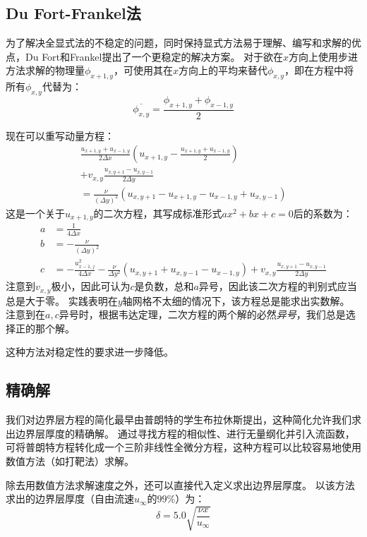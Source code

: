 \documentclass[12pt]{ctexart}
\begin{document}
\subsection{Du Fort-Frankel法}

为了解决全显式法的不稳定的问题，同时保持显式方法易于理解、编写和求解的优点，Du Fort和Frankel提出了一个更稳定的解决方案\cite{du1953stability}。
对于欲在$x$方向上使用步进方法求解的物理量$\phi_{x+1,y}$，可使用其在$x$方向上的平均来替代$\phi_{x, y}$，即在方程中将所有$\phi_{x,y}$代替为：
\[ \overline{\phi_{x,y}} = \frac{\phi_{x+1,y} + \phi_{x-1,y}}{2} \]

现在可以重写动量方程：
\begin{multline*}
    \frac{u_{x+1,y} + u_{x-1,y}}{2 \Delta x} \left( u_{x+1,y} - \frac{u_{x+1,y}+u_{x-1,y}}{2} \right) \\
    + v_{x,y} \frac{u_{x, y+1} - u_{x, y-1}}{2 \Delta y} \\
    = \frac{\nu}{(\Delta y)^2} (u_{x,y+1} - u_{x+1,y} - u_{x-1,y} + u_{x,y-1})
\end{multline*}
这是一个关于$u_{x+1, y}$的二次方程，其写成标准形式$ax^2+bx+c=0$后的系数为：
\[
    \begin{aligned}
        a &= \frac{1}{4 \Delta x} \\
        b &= - \frac{\nu}{(\Delta y)^2} \\
        c &= - \frac{u_{x-1,j}^2}{4 \Delta x} - \frac{\nu}{\Delta y^2} \left( u_{x,y+1} + u_{x,y-1} - u_{x-1,y} \right) + v_{x,y} \frac{u_{x, y+1} - u_{x, y-1}}{2 \Delta y}
    \end{aligned}
\]
注意到$v_{x,y}$极小，因此可认为$c$是负数，总和$a$异号，因此该二次方程的判别式应当总是大于零。
实践表明在$y$轴网格不太细的情况下，该方程总是能求出实数解。
注意到在$a,c$异号时，根据韦达定理，二次方程的两个解的必然\emph{异号}，我们总是选择正的那个解。

这种方法对稳定性的要求进一步降低。

\subsection{精确解}

我们对边界层方程的简化最早由普朗特的学生布拉休斯提出，这种简化允许我们求出边界层厚度的精确解\cite{blasius1907grenzschichten}。
通过寻找方程的相似性、进行无量纲化并引入流函数，可将普朗特方程转化成一个三阶非线性全微分方程，这种方程可以比较容易地使用数值方法（如打靶法）求解。

除去用数值方法求解速度之外，还可以直接代入定义求出边界层厚度。
以该方法求出的边界层厚度（自由流速$u_\infty$的$99\%$）为：
\[ \delta = 5.0 \sqrt{\frac{\nu x}{u_\infty}} \]
\end{document}
